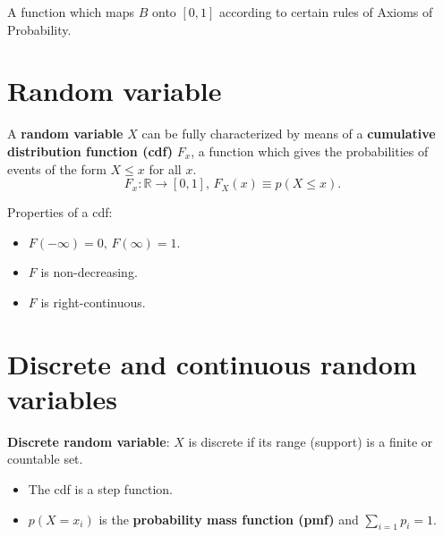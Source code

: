 \begin{definition} A function which maps $B$ onto $[0,1]$ according to certain rules of Axioms of Probability.
\end{definition}

\section{Random variable}

\begin{definition}
    A \textbf{random variable} $X$ can be fully characterized by means of a \textbf{cumulative distribution function (cdf)} $F_x$, a function which gives the probabilities of events of the form $X \leq x$ for all $x$. \[
        F_x : \mathbb{R} \to [0,1],\, F_X(x) \equiv p(X \leq x).
    \]
\end{definition}

Properties of a cdf: \begin{itemize}
    \item $F(-\infty ) = 0, \, F(\infty ) = 1$.
    \item $F$ is non-decreasing.
    \item $F$ is right-continuous.
\end{itemize}

\section{Discrete and continuous random variables}

\textbf{Discrete random variable}: $X$ is discrete if its range (support) is a finite or countable set. \begin{itemize}
    \item The cdf is a step function.
    \item $p(X=x_i)$ is the \textbf{probability mass function (pmf)} and $\sum_{i=1}^{} p_i = 1$.
\end{itemize}


